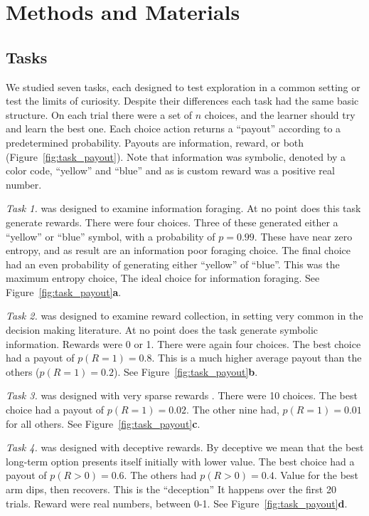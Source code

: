 \section*{Methods and Materials}
\subsection*{Tasks}
We studied seven tasks, each designed to test exploration in a common setting or test the limits of curiosity. Despite their differences each task had the same basic structure. On each trial there were a set of $n$ choices, and the learner should try and learn the best one. Each choice action returns a “payout” according to a predetermined probability. Payouts are information, reward, or both (Figure~\ref{fig:task_payout}). Note that information was symbolic, denoted by a color code, “yellow” and “blue” and as is custom reward was a positive real number.

\textit{Task 1.} was designed to examine information foraging. At no point does this task generate rewards. There were four choices. Three of these generated either a ``yellow'' or ``blue'' symbol, with a probability of $p=0.99$. These have near zero entropy, and as result are an information poor foraging choice. The final choice had an even probability of generating either ``yellow'' of ``blue''. This was the maximum entropy choice, The ideal choice for information foraging. See Figure~\ref{fig:task_payout}\textbf{a}. 

\textit{Task 2.} was designed to examine reward collection, in setting very common in the decision making literature. At no point does the task generate symbolic information. Rewards were 0 or 1. There were again four choices. The best choice had a payout of $p(R=1) = 0.8$. This is a much higher average payout than the others ($p(R=1) = 0.2$). See Figure~\ref{fig:task_payout}\textbf{b}. 

\textit{Task 3.} was designed with very sparse rewards \cite{Silver2016b,Silver2018}. There were 10 choices. The best choice had a payout of $p(R=1) = 0.02$. The other nine had, $p(R=1) = 0.01$ for all others. See Figure~\ref{fig:task_payout}\textbf{c}. 

\textit{Task 4.} was designed with deceptive rewards. By deceptive we mean that the best long-term option presents itself initially with lower value. The best choice had a payout of $p(R>0) = 0.6$. The others had $p(R>0) = 0.4$.  Value for the best arm dips, then recovers. This is the “deception” It happens over the first 20 trials. Reward were real numbers, between 0-1. See Figure~\ref{fig:task_payout}\textbf{d}. 

